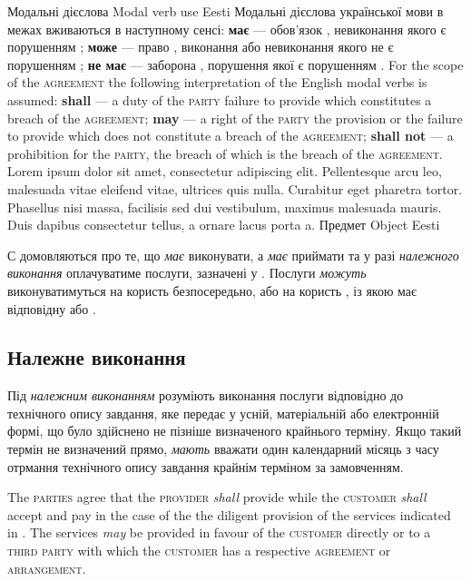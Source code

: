 \begin{Form}
\begin{paracol}{3}
      \clause
        {Модальні дієслова}
        {Modal verb use}
        {Eesti}
        {Модальні дієслова української мови в межах  вживаються в наступному сенсі: \textbf{має} — обов’язок , невиконання якого є порушенням ; \textbf{може} — право , виконання або невиконання якого не є порушенням ; \textbf{не має} — заборона , порушення якої є порушенням .}
        {For the scope of the \textsc{agreement} the following interpretation of the English modal verbs is assumed: \textbf{shall} — a duty of the \textsc{party} failure to provide which constitutes a breach of the \textsc{agreement}; \textbf{may} — a right of the \textsc{party} the provision or the failure to provide which does not constitute a breach of the \textsc{agreement}; \textbf{shall not} — a prohibition for the \textsc{party}, the breach of which is the breach of the \textsc{agreement}.}
        {Lorem ipsum dolor sit amet, consectetur adipiscing elit. Pellentesque arcu leo, malesuada vitae eleifend vitae, ultrices quis nulla. Curabitur eget pharetra tortor. Phasellus nisi massa, facilisis sed dui vestibulum, maximus malesuada mauris. Duis dapibus consectetur tellus, a ornare lacus porta a.}
      \clause
        {Предмет}
        {Object}
        {Eesti}
        {С домовляються про те, що  \textit{має} виконувати, а  \textit{має} приймати та у разі \emph{належного виконання} оплачуватиме послуги, зазначені у . Послуги \textit{можуть} виконуватимуться на користь  безпосередьно, або на користь , із якою  має відповідну  або .

        \subsection{Належне виконання}
        Під \emph{належним виконанням}  розуміють виконання послуги відповідно до технічного опису завдання, яке  передає  у усній, матеріальній або електронній формі, що було здійснено не пізніше визначеного крайнього терміну. Якщо такий термін не визначений прямо,  \emph{мають} вважати один календарний місяць з часу отрмання технічного опису завдання крайнім терміном за замовченням.
        }
        {The \textsc{parties} agree that the \textsc{provider} \textit{shall} provide while the \textsc{customer} \textit{shall} accept and pay in the case of the the diligent provision of the services indicated in . The services \textit{may} be provided in favour of the \textsc{customer} directly or to a \textsc{third party} with which the \textsc{customer} has a respective \textsc{agreement} or \textsc{arrangement}.

}
\end{paracol}
\end{Form}
